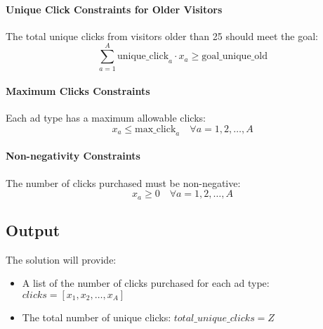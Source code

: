 \documentclass{article}
\begin{document}
\paragraph{Unique Click Constraints for Older Visitors}
The total unique clicks from visitors older than 25 should meet the goal:
\[
\sum_{a=1}^{A} \text{unique\_click}_{a} \cdot x_a \geq \text{goal\_unique\_old}
\]

\paragraph{Maximum Clicks Constraints}
Each ad type has a maximum allowable clicks:
\[
x_a \leq \text{max\_click}_{a} \quad \forall a = 1, 2, \ldots, A
\]

\paragraph{Non-negativity Constraints}
The number of clicks purchased must be non-negative:
\[
x_a \geq 0 \quad \forall a = 1, 2, \ldots, A
\]

\subsection*{Output}
The solution will provide:
\begin{itemize}
    \item A list of the number of clicks purchased for each ad type: \( clicks = [x_{1}, x_{2}, \ldots, x_{A}] \)
    \item The total number of unique clicks: \( total\_unique\_clicks = Z \)
\end{itemize}
\end{document}
